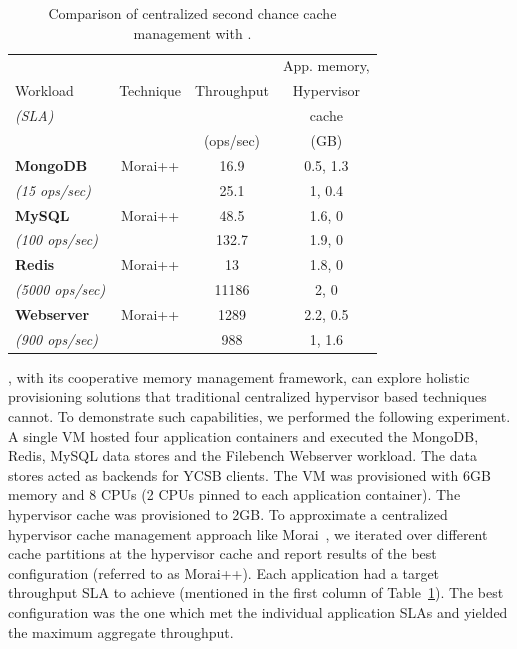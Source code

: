 \begin{table}[t]
\small
\begin{center}
\begin{tabular}{|l|c|c|c|}
\hline
{}           & {} & {} & {App. memory,}\\
{ Workload}  & { Technique} &  Throughput{} & {Hypervisor} \\
{\em (SLA)} & & { } & {cache}  \\
& & { (ops/sec)} & {(GB)}  \\
\hline 
\hline 
{\bf MongoDB} & Morai++ & 16.9 & 0.5, 1.3 \\
{\em (15 ops/sec)} & \dd{}& 25.1 & 1, 0.4  \\
\hline
{\bf MySQL} & Morai++ & 48.5 & 1.6, 0 \\
{\em (100 ops/sec)} & \dd{} & 132.7 & 1.9, 0 \\
\hline
{\bf Redis} & Morai++ & 13 & 1.8, 0 \\
{\em (5000 ops/sec)} & \dd{} & 11186  & 2, 0 \\
\hline
{\bf Webserver} & Morai++ & 1289 & 2.2, 0.5 \\
{\em (900 ops/sec)} & \dd{} & 988 & 1, 1.6  \\
\hline 
\end{tabular}
\caption{Comparison of centralized second chance cache management with \dd{}.}
\vspace{-1cm}
\label{table:ddsdc}
\end{center}
\end{table}
%
\dd{}, with its cooperative memory management framework, can explore 
holistic provisioning solutions that traditional centralized hypervisor
based techniques cannot.
%
To demonstrate such capabilities, we performed the following experiment.
%
A single VM hosted four application containers and executed the 
MongoDB, Redis, MySQL data stores and the Filebench Webserver workload.
The data stores acted as backends for YCSB clients.
The VM was provisioned with 6GB memory and 8 CPUs (2 CPUs pinned
to each application container).
%
The hypervisor cache was provisioned to 2GB.
%
To approximate a centralized hypervisor cache management approach 
like Morai~\cite{sdc},
we iterated over different cache partitions at the hypervisor 
cache and report
results of the best configuration (referred to as Morai++).
%
Each application had a target throughput SLA to achieve (mentioned
in the first column of Table~\ref{table:ddsdc}). The best configuration
was the one which met the individual application SLAs and yielded
the maximum aggregate throughput.
%
% 

